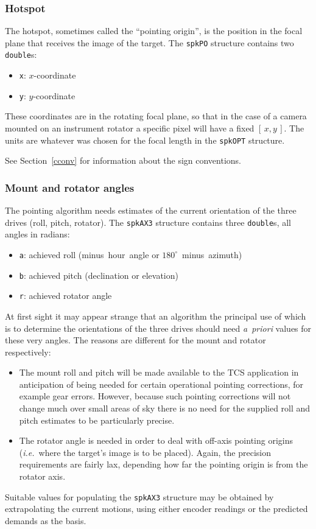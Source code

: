 \documentclass[11pt,fleqn,twoside,\paper]{article}
\renewcommand{\_}{{\tt\char'137}}     %
\newcommand{\xy}        {$[\,x,y\,]$}
\newcommand{\degi}[1]   {$#1^{\circ}$}
\begin{document}
\subsubsection{Hotspot}
\label{hspot}

The hotspot, sometimes called the ``pointing origin'', is the
position in the focal plane that receives the image of the
target.  The {\tt spkPO} structure contains two {\tt double}s:
\begin{itemize}
\item {\tt x}: $x$-coordinate
\item {\tt y}: $y$-coordinate
\end{itemize}
These coordinates are in the rotating focal plane, so that in
the case of a camera mounted on an instrument rotator a
specific pixel will have a fixed \xy.  The units are whatever
was chosen for the focal length in the {\tt spkOPT} structure.

See Section~\ref{cconv} for information about the sign
conventions.

\subsubsection{Mount and rotator angles}
\label{axes}

The pointing algorithm needs estimates of the current
orientation of the three drives (roll, pitch, rotator).
The {\tt spkAX3} structure contains three {\tt double}s, all
angles in radians:
\begin{itemize}
\item {\tt a}: achieved roll (minus~hour~angle or \degi{180}~minus~azimuth)
\item {\tt b}: achieved pitch (declination or elevation)
\item {\tt r}: achieved rotator angle
\end{itemize}
At first sight it may appear strange that an algorithm the
principal use of which is to determine the orientations of
the three drives should need {\it a~priori} values for these
very angles.  The reasons are different for the mount and rotator
respectively:
\begin{itemize}
\item The mount roll and pitch will be made available to the
TCS application in anticipation of being needed for certain
operational pointing corrections, for example gear errors.
However, because such pointing
corrections will not change much over small areas of sky there
is no need for the supplied roll and pitch estimates to be
particularly precise.
\item The rotator angle is needed in order to deal with
off-axis pointing origins ({\it i.e.}~where the target's image
is to be placed).  Again, the precision requirements are fairly
lax, depending how far the pointing origin is from the rotator
axis.
\end{itemize}
Suitable values for populating the {\tt spkAX3} structure
may be obtained by extrapolating the current motions, using
either encoder readings or the predicted demands as the basis.
\end{document}
